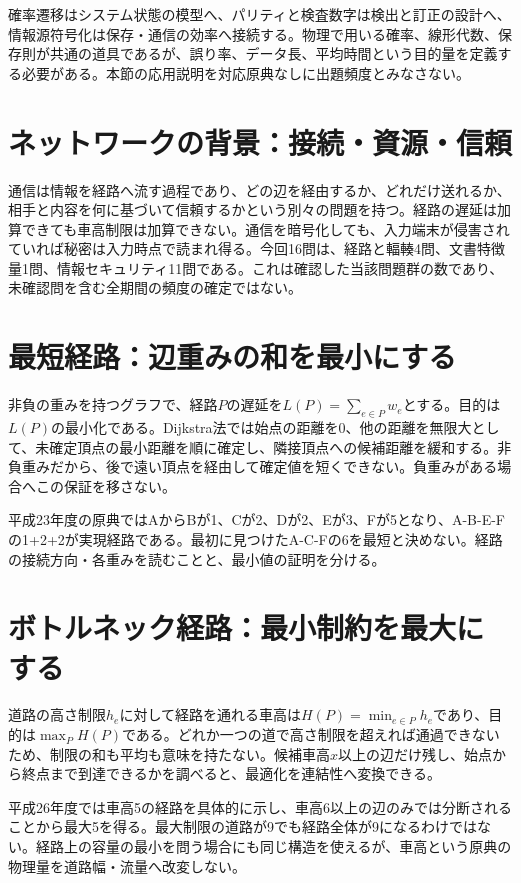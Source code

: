 \begin{tcolorbox}[title=情報工学への接続]
確率遷移はシステム状態の模型へ、パリティと検査数字は検出と訂正の設計へ、情報源符号化は保存・通信の効率へ接続する。物理で用いる確率、線形代数、保存則が共通の道具であるが、誤り率、データ長、平均時間という目的量を定義する必要がある。本節の応用説明を対応原典なしに出題頻度とみなさない。
\end{tcolorbox}

\section{ネットワークの背景：接続・資源・信頼}
通信は情報を経路へ流す過程であり、どの辺を経由するか、どれだけ送れるか、相手と内容を何に基づいて信頼するかという別々の問題を持つ。経路の遅延は加算できても車高制限は加算できない。通信を暗号化しても、入力端末が侵害されていれば秘密は入力時点で読まれ得る。今回16問は、経路と輻輳4問、文書特徴量1問、情報セキュリティ11問である。これは確認した当該問題群の数であり、未確認問を含む全期間の頻度の確定ではない。

\section{最短経路：辺重みの和を最小にする}
\label{theory:network:shortest}
非負の重みを持つグラフで、経路$P$の遅延を$L(P)=\sum_{e\in P}w_e$とする。目的は$L(P)$の最小化である。Dijkstra法では始点の距離を0、他の距離を無限大として、未確定頂点の最小距離を順に確定し、隣接頂点への候補距離を緩和する。非負重みだから、後で遠い頂点を経由して確定値を短くできない\cite{net_dijkstra}。負重みがある場合へこの保証を移さない。

平成23年度の原典ではAからBが1、Cが2、Dが2、Eが3、Fが5となり、A-B-E-Fの1+2+2が実現経路である。最初に見つけたA-C-Fの6を最短と決めない。経路の接続方向・各重みを読むことと、最小値の証明を分ける。

\section{ボトルネック経路：最小制約を最大にする}
\label{theory:network:bottleneck}
道路の高さ制限$h_e$に対して経路を通れる車高は$H(P)=\min_{e\in P}h_e$であり、目的は$\max_P H(P)$である。どれか一つの道で高さ制限を超えれば通過できないため、制限の和も平均も意味を持たない。候補車高$x$以上の辺だけ残し、始点から終点まで到達できるかを調べると、最適化を連結性へ変換できる。

平成26年度では車高5の経路を具体的に示し、車高6以上の辺のみでは分断されることから最大5を得る。最大制限の道路が9でも経路全体が9になるわけではない。経路上の容量の最小を問う場合にも同じ構造を使えるが、車高という原典の物理量を道路幅・流量へ改変しない。

